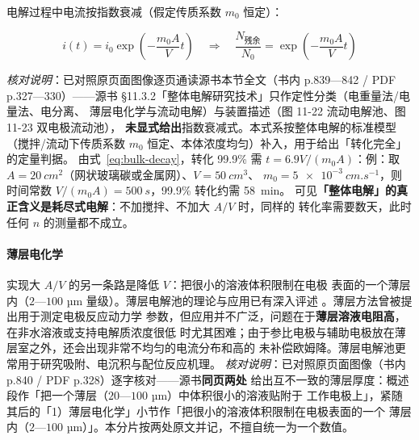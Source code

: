 电解过程中电流按指数衰减（假定传质系数 $m_0$ 恒定）：

\begin{equation}
i(t)=i_0\exp\!\left(-\frac{m_0A}{V}t\right)
\quad\Longrightarrow\quad
\frac{N_{\text{残余}}}{N_0}=\exp\!\left(-\frac{m_0A}{V}t\right)
\label{eq:bulk-decay}
\end{equation}

\emph{核对说明}：已对照原页面图像逐页通读源书本节全文（书内 p.839—842 / PDF
p.327—330）——源书 §11.3.2「整体电解研究技术」只作定性分类（电重量法/电量法、电分离、
薄层电化学与流动电解）与装置描述（图 11-22 流动电解池、图 11-23 双电极流动池），
\textbf{未显式给出}指数衰减式。本式系按整体电解的标准模型（搅拌/流动下传质系数 $m_0$
恒定、本体浓度均匀）补入，用于给出「转化完全」的定量判据。
由式~\eqref{eq:bulk-decay}，转化 99.9\% 需 $t=6.9V/(m_0A)$：例：取
$A=\qty{20}{cm^2}$（网状玻璃碳或金属网）、$V=\qty{50}{cm^3}$、
$m_0=\qty{5e-3}{cm.s^{-1}}$，则时间常数 $V/(m_0A)=\qty{500}{s}$，99.9\% 转化约需
\qty{58}{min}。
可见\textbf{「整体电解」的真正含义是耗尽式电解}：不加搅拌、不加大 $A/V$ 时，同样的
转化率需要数天，此时任何 $n$ 的测量都不成立。

\paragraph{薄层电化学} 实现大 $A/V$ 的另一条路是降低 $V$：把很小的溶液体积限制在电极
表面的一个薄层内（$2$—$100$ µm 量级）。薄层电解池的理论与应用已有深入评述
。薄层方法曾被提出用于测定电极反应动力学
参数，但应用并不广泛，问题在于\textbf{薄层溶液电阻高}，在非水溶液或支持电解质浓度很低
时尤其困难；由于参比电极与辅助电极放在薄层室之外，还会出现非常不均匀的电流分布和高的
未补偿欧姆降。薄层电解池更常用于研究吸附、电沉积与配位反应机理。
\emph{核对说明}：已对照原页面图像（书内 p.840 / PDF p.328）逐字核对——源书\textbf{同页两处}
给出互不一致的薄层厚度：概述段作「把一个薄层（$20$—$100$ µm）中体积很小的溶液贴附于
工作电极上」，紧随其后的「1）薄层电化学」小节作「把很小的溶液体积限制在电极表面的一个
薄层内（$2$—$100$ µm）」。本分片按两处原文并记，不擅自统一为一个数值。

